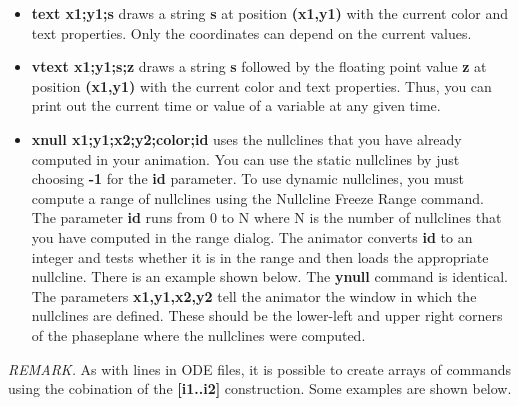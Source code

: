 \documentclass{article}
\begin{document}
\begin{itemize}
\item {\bf text x1;y1;s} draws a string {\bf s} at position {\bf
(x1,y1)} with the current color and text properties. Only the
coordinates can depend on the current values. 

\item {\bf vtext x1;y1;s;z} draws a string {\bf s} followed by
the floating point value {\bf z} at position {\bf
(x1,y1)} with the current color and text properties. Thus, you can
print out the current time or value of a variable at any given time.

\item{\bf xnull x1;y1;x2;y2;color;id} uses the nullclines that you
have already computed in your animation.  You can use the static
nullclines by just choosing {\bf -1} for the {\bf id} parameter.  To
use dynamic nullclines, you must compute a range of nullclines using
the Nullcline Freeze Range command.  The parameter {\bf id} runs from
0 to N where N is the number of nullclines that you have computed in
the range dialog.  The animator converts {\bf id} to an integer and
tests whether it is in the range and then loads the appropriate
nullcline. There is an example shown below. The {\bf ynull} command is
identical. The parameters {\bf x1,y1,x2,y2} tell the animator the
window in which the nullclines are defined.  These should be the
lower-left and upper right corners of the phaseplane where the
nullclines were computed.

\end{itemize}

{\em REMARK.}  As with lines in ODE files, it is possible to create
arrays of commands using the cobination of the {\bf [i1..i2] }
construction. Some examples are shown below. 
\end{document}
